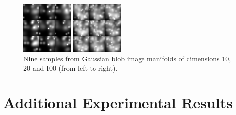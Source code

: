 \begin{figure}[h]
\begin{minipage}{.3\textwidth}
            \includegraphics[width=.75\columnwidth]{chapter3/figures/image_manifolds/blobs/20.png}
        \end{minipage}
        \begin{minipage}{.3\textwidth}
            \centering
            \includegraphics[width=.75\columnwidth]{chapter3/figures/image_manifolds/blobs/100.png}
        \end{minipage} 
        \caption{Nine samples from Gaussian blob image manifolds of dimensions 10, 20 and 100 (from left to right).}
        \label{ch3:fig:gaussian-blobs}     
   \end{figure}

   \section{Additional Experimental Results}
   \label{ch3:appendix:additional_experimental_results}
   
